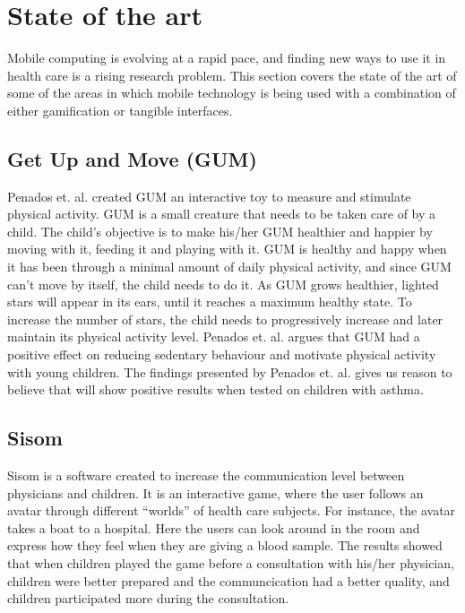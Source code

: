 \section{State of the art}
Mobile computing is evolving at a rapid pace, and finding new ways to use it in health care is a rising research problem. This section covers the state of the art of some of the areas in which mobile technology is being used with a combination of either gamification or tangible interfaces.   


\subsection{Get Up and Move (GUM)}
\label{sec:gum}
Penados et. al.\cite{penadosget} created GUM an interactive toy to measure and stimulate physical activity. GUM is a small creature that needs to be taken care of by a child. The child's objective is to make his/her GUM healthier and happier by moving with it, feeding it and playing with it. GUM is healthy and happy when it has been through a minimal amount of daily physical activity, and since GUM can't move by itself, the child needs to do it. As GUM grows healthier, lighted stars will appear in its ears, until it reaches a maximum healthy state. To increase the number of stars, the child needs to progressively increase and later maintain its physical activity level. Penados et. al. argues that GUM had a positive effect on reducing sedentary behaviour and motivate physical activity with young children. The findings presented by Penados et. al.\cite{penadosget} gives us reason to believe that \buddy{} will show positive results when tested on children with asthma. 


\subsection{Sisom}
Sisom is a software created to increase the communication level between physicians and children. It is an interactive game, where the user follows an avatar through different ``worlds'' of health care subjects. For instance, the avatar takes a boat to a hospital. Here the users can look around in the room and express how they feel when they are giving a blood sample. The results showed that when children played the game before a consultation with his/her physician, children were better prepared and the communcication had a better quality, and children participated more during the consultation\cite{sisom-research}.



